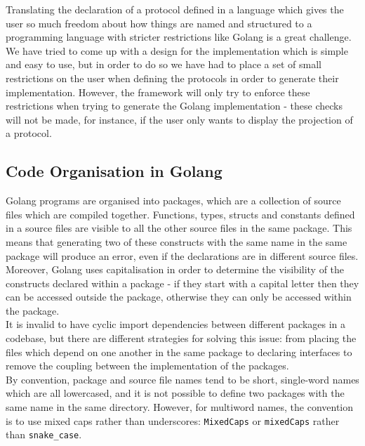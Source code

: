 \documentclass[12pt,twoside]{report}
\begin{document}
Translating the declaration of a protocol defined in a language which gives the user so much freedom about how things are named and structured to a programming language with stricter restrictions like Golang is a great challenge. We have tried to come up with a design for the implementation which is simple and easy to use, but in order to do so we have had to place a set of small restrictions on the user when defining the protocols in order to generate their implementation. However, the framework will only try to enforce these restrictions when trying to generate the Golang implementation - these checks will not be made, for instance, if the user only wants to display the projection of a protocol.\\

\subsection{Code Organisation in Golang}

Golang programs are organised into packages, which are a collection of source files which are compiled together. Functions, types, structs and constants defined in a source files are visible to all the other source files in the same package\cite{godocs}. This means that generating two of these constructs with the same name in the same package will produce an error, even if the declarations are in different source files. Moreover, Golang uses capitalisation in order to determine the visibility of the constructs declared within a package - if they start with a capital letter then they can be accessed outside the package, otherwise they can only be accessed within the package.\\

It is invalid to have cyclic import dependencies between different packages in a codebase, but there are different strategies for solving this issue: from placing the files which depend on one another in the same package to declaring interfaces to remove the coupling between the implementation of the packages.\\

By convention, package and source file names tend to be short, single-word names which are all lowercased, and it is not possible to define two packages with the same name in the same directory. However, for multiword names, the convention is to use mixed caps rather than underscores: \texttt{MixedCaps} or \texttt{mixedCaps} rather than \texttt{snake\_case}.\\
\end{document}
